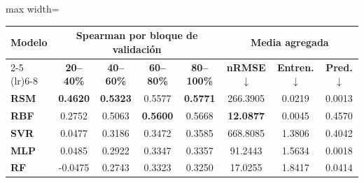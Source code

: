 \begin{table}[H]
    \centering
    \small
    \setlength{\tabcolsep}{5pt}
    \renewcommand{\arraystretch}{1.12}
    \begin{adjustbox}{max width=\textwidth}
        \begin{tabular}{l cccc ccc}
            \toprule
            \multirow{2}{*}{\textbf{Modelo}}
                             & \multicolumn{4}{c}{\textbf{Spearman por bloque de validación}}
                             & \multicolumn{3}{c}{\textbf{Media agregada}}                                                                                                                                 \\
            \cmidrule(lr){2-5} \cmidrule(lr){6-8}
                             & \textbf{20--40\%}
                             & \textbf{40--60\%}
                             & \textbf{60--80\%}
                             & \textbf{80--100\%}
                             & \textbf{nRMSE $\downarrow$}
                             & \textbf{Entren. $\downarrow$}
                             & \textbf{Pred. $\downarrow$}                                                                                                                                                 \\
            \midrule
            \rowcolor{gray!10}
            \textbf{RSM}     & \textbf{0.4620}                                                & \textbf{0.5323} & 0.5577          & \textbf{0.5771} & 266.3905         & 0.0219          & 0.0013          \\
            \rowcolor{gray!10}
            \textbf{RBF}     & 0.2752                                                         & 0.5063          & \textbf{0.5600} & 0.5668          & \textbf{12.0877} & 0.0045          & 0.4570          \\
            \addlinespace[2pt]
            \textbf{SVR}     & 0.0477                                                         & 0.3186          & 0.3472          & 0.3585          & 668.8085         & 1.3806          & 0.4042          \\
            \textbf{MLP}     & 0.0485                                                         & 0.2922          & 0.3347          & 0.3357          & 91.2443          & 1.5634          & 0.0018          \\
            \textbf{RF}      & -0.0475                                                        & 0.2743          & 0.3323          & 0.3250          & 17.0255          & 1.8417          & 0.0414          \\

\end{tabular}
\end{adjustbox}
\end{table}
